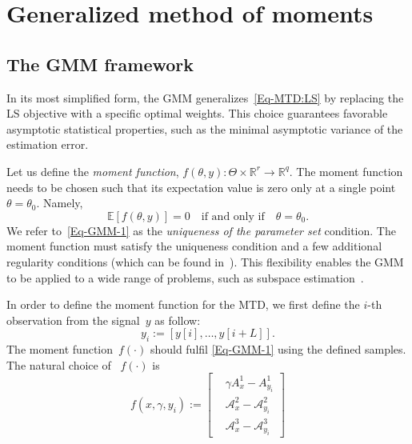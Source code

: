 \documentclass{article}
\newcommand{\A}[0]{\mathcal{A}}
\newcommand{\E}[0]{\mathbb{E}}
\newcommand{\R}[0]{\mathbb{R}}
\begin{document}
\section{Generalized method of moments}
\label{gmm}
\subsection{The GMM framework}\label{gmm:framwork}

In its most simplified form, the GMM generalizes~\eqref{Eq-MTD:LS} by replacing the LS objective with a specific optimal weights. This choice guarantees favorable asymptotic statistical properties, such as {the} minimal asymptotic variance of the estimation error.

Let us define the \textit{moment function}, $f(\theta, y)\colon \Theta \times \R^r \to \R^q$. The moment function needs to be chosen such that its expectation value is zero only at a single point $\theta=\theta_0$. Namely,
\begin{equation}\label{Eq-GMM-1}
	\E\left[f(\theta,y)\right] = 0 \quad \text{if and only if} \quad \theta = \theta_0.
\end{equation}
We refer to~\eqref{Eq-GMM-1} as the \textit{uniqueness of the parameter set} condition. The moment function must satisfy the uniqueness condition and a few additional regularity conditions (which can be found in~\cite{Hansen1982, abas2021generalized}). This flexibility enables the GMM to be applied to a wide range of problems, such as subspace estimation~\cite{Fan2018}.

In order to define the moment function for the MTD, we first define the $i$-th observation from the signal~$y$ as follow:
\begin{equation}
	y_i := [y[i],\ldots, y[i+L]].
\end{equation}
The moment function~$f(\cdot)$ should fulfil \eqref{Eq-GMM-1} using the defined samples. The natural choice of ~$f(\cdot)$ is
\begin{equation} \label{Eq-GMM-2}
	f(x,\gamma,y_i) :=
	\begin{bmatrix}
		&\gamma A_x^1 - A_{y_i}^1\\
		&\A_x^2 - \A_{y_i}^2 \\
		&\A_x^3 - \A_{y_i}^3
	\end{bmatrix}
\end{equation}
\end{document}
